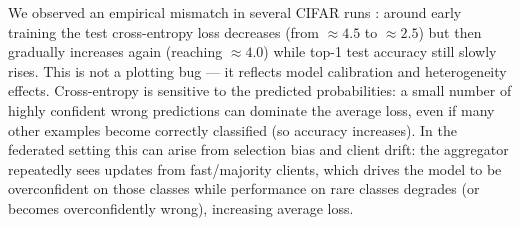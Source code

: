 \documentclass[10pt,twocolumn,letterpaper]{article}
\begin{document}
We observed an empirical mismatch in several CIFAR runs \cite{hsu2019measuring,kairouz2021advances}: around early training the test cross-entropy loss decreases (from $\approx4.5$ to $\approx2.5$) but then gradually increases again (reaching $\approx4.0$) while top-1 test accuracy still slowly rises. This is not a plotting bug — it reflects model calibration and heterogeneity effects. Cross-entropy is sensitive to the predicted probabilities: a small number of highly confident wrong predictions can dominate the average loss, even if many other examples become correctly classified (so accuracy increases). In the federated setting this can arise from selection bias and client drift: the aggregator repeatedly sees updates from fast/majority clients, which drives the model to be overconfident on those classes while performance on rare classes degrades (or becomes overconfidently wrong), increasing average loss.  \cite{karimireddy2020scaffold,li2018federated,nemeth2022client}
\end{document}
